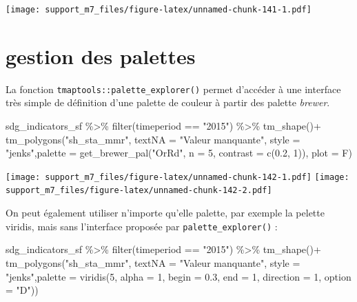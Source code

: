 \documentclass[
]{book}
\newenvironment{Shaded}{\begin{snugshade}}{\end{snugshade}}
\newcommand{\AttributeTok}[1]{\textcolor[rgb]{0.77,0.63,0.00}{#1}}
\newcommand{\DecValTok}[1]{\textcolor[rgb]{0.00,0.00,0.81}{#1}}
\newcommand{\FloatTok}[1]{\textcolor[rgb]{0.00,0.00,0.81}{#1}}
\newcommand{\FunctionTok}[1]{\textcolor[rgb]{0.00,0.00,0.00}{#1}}
\newcommand{\NormalTok}[1]{#1}
\newcommand{\SpecialCharTok}[1]{\textcolor[rgb]{0.00,0.00,0.00}{#1}}
\newcommand{\StringTok}[1]{\textcolor[rgb]{0.31,0.60,0.02}{#1}}
\begin{document}
\texttt{[image: support\_m7\_files/figure-latex/unnamed-chunk-141-1.pdf]}

\hypertarget{gestion-des-palettes}{%
\section{gestion des palettes}\label{gestion-des-palettes}}

La fonction \texttt{tmaptools::palette\_explorer()} permet d'accéder à une interface très simple de définition d'une palette de couleur à partir des palette \emph{brewer}.

\begin{Shaded}
\begin{Highlighting}[]
\NormalTok{sdg\_indicators\_sf }\SpecialCharTok{\%\textgreater{}\%} 
  \FunctionTok{filter}\NormalTok{(timeperiod }\SpecialCharTok{==} \StringTok{"2015"}\NormalTok{) }\SpecialCharTok{\%\textgreater{}\%} 
  \FunctionTok{tm\_shape}\NormalTok{()}\SpecialCharTok{+}
  \FunctionTok{tm\_polygons}\NormalTok{(}\StringTok{"sh\_sta\_mmr"}\NormalTok{, }\AttributeTok{textNA =} \StringTok{"Valeur manquante"}\NormalTok{, }\AttributeTok{style =} \StringTok{"jenks"}\NormalTok{,}\AttributeTok{palette =} \FunctionTok{get\_brewer\_pal}\NormalTok{(}\StringTok{"OrRd"}\NormalTok{, }\AttributeTok{n =} \DecValTok{5}\NormalTok{, }\AttributeTok{contrast =} \FunctionTok{c}\NormalTok{(}\FloatTok{0.2}\NormalTok{, }\DecValTok{1}\NormalTok{)), }\AttributeTok{plot =}\NormalTok{ F)}
\end{Highlighting}
\end{Shaded}

\texttt{[image: support\_m7\_files/figure-latex/unnamed-chunk-142-1.pdf]} \texttt{[image: support\_m7\_files/figure-latex/unnamed-chunk-142-2.pdf]}

On peut également utiliser n'importe qu'elle palette, par exemple la pelette viridis, mais sans l'interface proposée par \texttt{palette\_explorer()} :

\begin{Shaded}
\begin{Highlighting}[]
\NormalTok{sdg\_indicators\_sf }\SpecialCharTok{\%\textgreater{}\%} 
  \FunctionTok{filter}\NormalTok{(timeperiod }\SpecialCharTok{==} \StringTok{"2015"}\NormalTok{) }\SpecialCharTok{\%\textgreater{}\%} 
  \FunctionTok{tm\_shape}\NormalTok{()}\SpecialCharTok{+}
  \FunctionTok{tm\_polygons}\NormalTok{(}\StringTok{"sh\_sta\_mmr"}\NormalTok{, }\AttributeTok{textNA =} \StringTok{"Valeur manquante"}\NormalTok{, }\AttributeTok{style =} \StringTok{"jenks"}\NormalTok{,}\AttributeTok{palette =} \FunctionTok{viridis}\NormalTok{(}\DecValTok{5}\NormalTok{, }\AttributeTok{alpha =} \DecValTok{1}\NormalTok{, }\AttributeTok{begin =} \FloatTok{0.3}\NormalTok{, }\AttributeTok{end =} \DecValTok{1}\NormalTok{, }\AttributeTok{direction =} \DecValTok{1}\NormalTok{, }\AttributeTok{option =} \StringTok{"D"}\NormalTok{))}
\end{Highlighting}
\end{Shaded}
\end{document}
